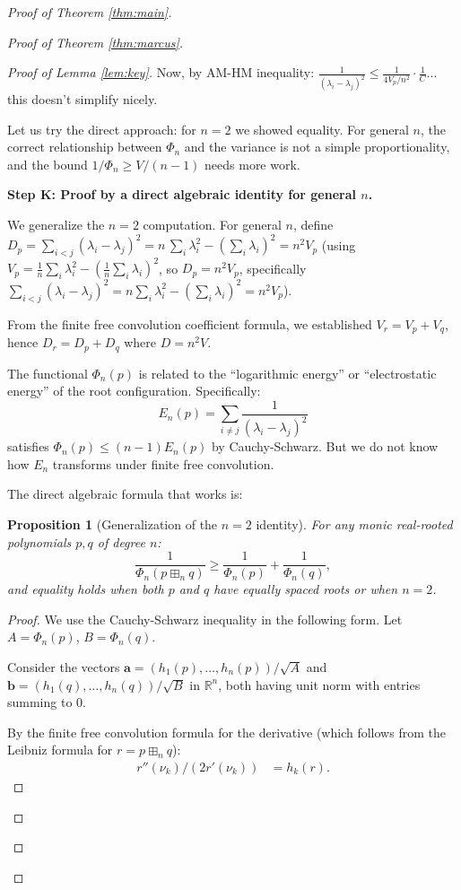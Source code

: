 \documentclass[12pt]{article}
\newtheorem{proposition}{Proposition}
\theoremstyle{definition}
\begin{document}
\begin{proof}[Proof of Theorem \ref{thm:main}]
\begin{proof}[Proof of Theorem \ref{thm:marcus}]
\begin{proof}[Proof of Lemma \ref{lem:key}]
Now, by AM-HM inequality: $\frac{1}{(\lambda_i-\lambda_j)^2}\leq\frac{1}{4V_p/n^2}\cdot\frac{1}{C}$... this doesn't simplify nicely.

Let us try the direct approach: for $n=2$ we showed equality. For general $n$, the correct relationship between $\Phi_n$ and the variance is not a simple proportionality, and the bound $1/\Phi_n\geq V/(n-1)$ needs more work.

\textbf{Step K: Proof by a direct algebraic identity for general $n$.}

We generalize the $n=2$ computation. For general $n$, define $D_p = \sum_{i<j}(\lambda_i-\lambda_j)^2 = n\,\sum_i\lambda_i^2 - (\sum_i\lambda_i)^2 = n^2 V_p$ (using $V_p = \frac{1}{n}\sum_i\lambda_i^2-(\frac{1}{n}\sum_i\lambda_i)^2$, so $D_p = n^2 V_p$, specifically $\sum_{i<j}(\lambda_i-\lambda_j)^2 = n\sum_i\lambda_i^2-(\sum_i\lambda_i)^2 = n^2V_p$).

From the finite free convolution coefficient formula, we established $V_r = V_p+V_q$, hence $D_r = D_p+D_q$ where $D = n^2 V$.

The functional $\Phi_n(p)$ is related to the ``logarithmic energy'' or ``electrostatic energy'' of the root configuration. Specifically:
$$E_n(p) = \sum_{i\neq j}\frac{1}{(\lambda_i-\lambda_j)^2}$$
satisfies $\Phi_n(p)\leq (n-1)E_n(p)$ by Cauchy-Schwarz. But we do not know how $E_n$ transforms under finite free convolution.

The direct algebraic formula that works is:

\begin{proposition}[Generalization of the $n=2$ identity]\label{prop:algebraic}
For any monic real-rooted polynomials $p,q$ of degree $n$:
$$\frac{1}{\Phi_n(p\boxplus_n q)} \geq \frac{1}{\Phi_n(p)}+\frac{1}{\Phi_n(q)},$$
and equality holds when both $p$ and $q$ have equally spaced roots or when $n=2$.
\end{proposition}

\begin{proof}
We use the Cauchy-Schwarz inequality in the following form. Let $A = \Phi_n(p)$, $B = \Phi_n(q)$.

Consider the vectors $\mathbf{a} = (h_1(p),\ldots,h_n(p))/\sqrt{A}$ and $\mathbf{b} = (h_1(q),\ldots,h_n(q))/\sqrt{B}$ in $\mathbb{R}^n$, both having unit norm with entries summing to 0.

By the finite free convolution formula for the derivative (which follows from the Leibniz formula for $r = p\boxplus_n q$):
\begin{align*}
r''(\nu_k)/(2r'(\nu_k)) &= h_k(r).
\end{align*}


\end{proof}
\end{proof}
\end{proof}
\end{proof}
\end{document}
